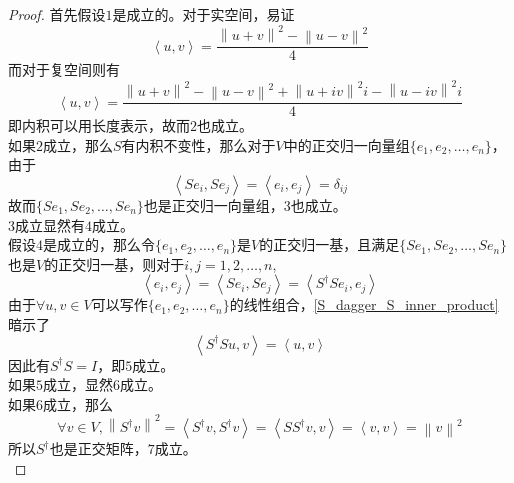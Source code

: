 \documentclass[12pt,a4paper,openany,twoside]{book}
\numberwithin{equation}{section}
\begin{document}
        \begin{proof}
          首先假设$1$是成立的。对于实空间，易证
          \begin{equation}
            \left\langle u,v\right\rangle=\frac{\left\|u+v\right\|^2-\left\|u-v\right\|^2}{4}
          \end{equation}
          而对于复空间则有
          \begin{equation}
            \left\langle u,v\right\rangle=\frac{\left\|u+v\right\|^2-\left\|u-v\right\|^2+\left\|u+iv\right\|^2i-\left\|u-iv\right\|^2i}{4}
          \end{equation}
          即内积可以用长度表示，故而$2$也成立。\\
          如果$2$成立，那么$S$有内积不变性，那么对于$V$中的正交归一向量组$\{e_1,e_2,\dots,e_n\}$，由于
          \begin{equation}
            \left\langle Se_i,Se_j\right\rangle=\left\langle e_i,e_j\right\rangle=\delta_{ij}
          \end{equation}
          故而$\{Se_1,Se_2,\dots,Se_n\}$也是正交归一向量组，$3$也成立。\\
          $3$成立显然有$4$成立。\\
          假设$4$是成立的，那么令$\{e_1,e_2,\dots,e_n\}$是$V$的正交归一基，且满足$\{Se_1,Se_2,\dots,Se_n\}$也是$V$的正交归一基，则对于$i,j=1,2,\dots,n$,
          \begin{equation}
            \label{S_dagger_S_inner_product}
            \left\langle e_i,e_j\right\rangle=\left\langle Se_i,Se_j\right\rangle=\left\langle S^\dagger Se_i,e_j\right\rangle
          \end{equation}
          由于$\forall u,v\in V$可以写作$\{e_1,e_2,\dots,e_n\}$的线性组合，\ref{S_dagger_S_inner_product}暗示了
          \begin{equation}
            \left\langle S^\dagger Su,v\right\rangle=\left\langle u,v\right\rangle
          \end{equation}
          因此有$S^\dagger S=I$，即$5$成立。\\
          如果$5$成立，显然$6$成立。\\
          如果$6$成立，那么
          \begin{equation}
            \forall v\in V, \left\|S^\dagger v\right\|^2=\left\langle S^\dagger v,S^\dagger v\right\rangle=\left\langle SS^\dagger v,v\right\rangle=\left\langle v,v\right\rangle=\left\|v\right\|^2
          \end{equation}
          所以$S^\dagger$也是正交矩阵，$7$成立。\\

\end{proof}
\end{document}
